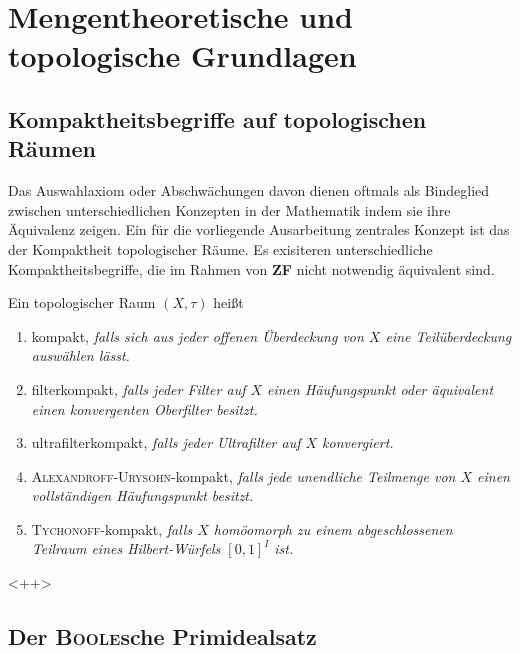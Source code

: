 \chapter{Mengentheoretische und topologische Grundlagen}



\section{Kompaktheitsbegriffe auf topologischen Räumen}

Das Auswahlaxiom oder Abschwächungen davon dienen oftmals als Bindeglied zwischen unterschiedlichen Konzepten in der Mathematik indem sie ihre Äquivalenz zeigen. 
Ein für die vorliegende Ausarbeitung zentrales Konzept ist das der Kompaktheit topologischer Räume. 
Es exisiteren unterschiedliche Kompaktheitsbegriffe, die im Rahmen von \textbf{ZF} nicht notwendig äquivalent sind.

\begin{defn}
  Ein topologischer Raum $(X,\tau)$ heißt
  \begin{enumerate}[(1)]
    \item kompakt, \textit{falls sich aus jeder offenen Überdeckung von $X$ eine Teilüberdeckung auswählen lässt.}
    \item filterkompakt, \textit{falls jeder Filter auf $X$ einen Häufungspunkt oder äquivalent einen konvergenten Oberfilter besitzt.}
    \item ultrafilterkompakt, \textit{falls jeder Ultrafilter auf $X$ konvergiert.}
    \item \textsc{Alexandroff}-\textsc{Urysohn}-kompakt, \textit{falls jede unendliche Teilmenge von $X$ einen vollständigen Häufungspunkt besitzt.}
    \item \textsc{Tychonoff}-kompakt, \textit{falls $X$ homöomorph zu einem abgeschlossenen Teilraum eines Hilbert-Würfels $[0,1]^I$ ist.}
  \end{enumerate}
\end{defn}<++>

\section{Der \textsc{Boole}sche Primidealsatz}

